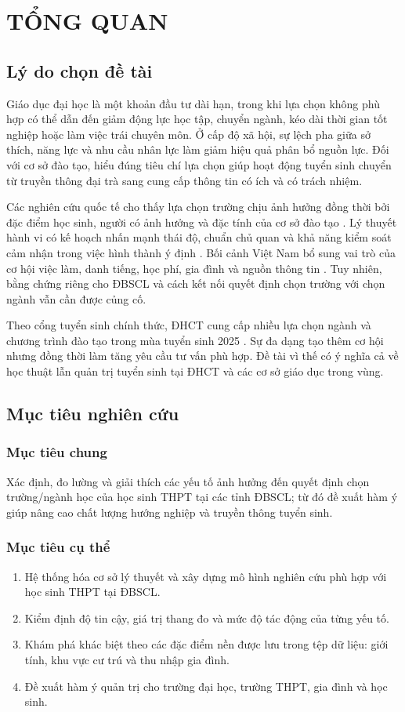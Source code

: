 \chapter{TỔNG QUAN}
\section{Lý do chọn đề tài}
Giáo dục đại học là một khoản đầu tư dài hạn, trong khi lựa chọn không phù hợp có thể dẫn đến giảm động lực học tập, chuyển ngành, kéo dài thời gian tốt nghiệp hoặc làm việc trái chuyên môn. Ở cấp độ xã hội, sự lệch pha giữa sở thích, năng lực và nhu cầu nhân lực làm giảm hiệu quả phân bổ nguồn lực. Đối với cơ sở đào tạo, hiểu đúng tiêu chí lựa chọn giúp hoạt động tuyển sinh chuyển từ truyền thông đại trà sang cung cấp thông tin có ích và có trách nhiệm.

Các nghiên cứu quốc tế cho thấy lựa chọn trường chịu ảnh hưởng đồng thời bởi đặc điểm học sinh, người có ảnh hưởng và đặc tính của cơ sở đào tạo \citep{chapman1981,hossler1987}. Lý thuyết hành vi có kế hoạch nhấn mạnh thái độ, chuẩn chủ quan và khả năng kiểm soát cảm nhận trong việc hình thành ý định \citep{ajzen1991}. Bối cảnh Việt Nam bổ sung vai trò của cơ hội việc làm, danh tiếng, học phí, gia đình và nguồn thông tin \citep{le2022,hai2023}. Tuy nhiên, bằng chứng riêng cho ĐBSCL và cách kết nối quyết định chọn trường với chọn ngành vẫn cần được củng cố.

Theo cổng tuyển sinh chính thức, ĐHCT cung cấp nhiều lựa chọn ngành và chương trình đào tạo trong mùa tuyển sinh 2025 \citep{ctu2025}. Sự đa dạng tạo thêm cơ hội nhưng đồng thời làm tăng yêu cầu tư vấn phù hợp. Đề tài vì thế có ý nghĩa cả về học thuật lẫn quản trị tuyển sinh tại ĐHCT và các cơ sở giáo dục trong vùng.

\section{Mục tiêu nghiên cứu}
\subsection{Mục tiêu chung}
Xác định, đo lường và giải thích các yếu tố ảnh hưởng đến quyết định chọn trường/ngành học của học sinh THPT tại các tỉnh ĐBSCL; từ đó đề xuất hàm ý giúp nâng cao chất lượng hướng nghiệp và truyền thông tuyển sinh.

\subsection{Mục tiêu cụ thể}
\begin{enumerate}[label=\arabic*)]
\item Hệ thống hóa cơ sở lý thuyết và xây dựng mô hình nghiên cứu phù hợp với học sinh THPT tại ĐBSCL.
\item Kiểm định độ tin cậy, giá trị thang đo và mức độ tác động của từng yếu tố.
\item Khám phá khác biệt theo các đặc điểm nền được lưu trong tệp dữ liệu: giới tính, khu vực cư trú và thu nhập gia đình.
\item Đề xuất hàm ý quản trị cho trường đại học, trường THPT, gia đình và học sinh.
\end{enumerate}

